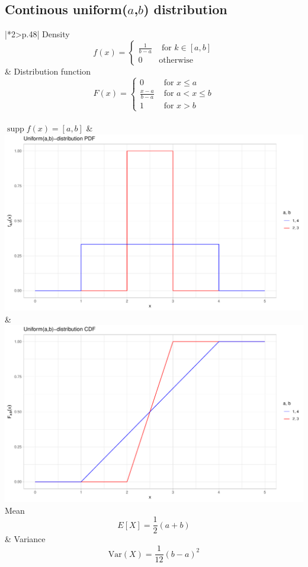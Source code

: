 \documentclass{article}
\DeclareMathOperator\supp{supp}
\begin{document}
	\subsection{Continous uniform($a$,$b$) distribution}
	\begin{tabular}{|*2{>{\centering\arraybackslash}p{}|}}
		\hline
		Density
		\[ f \left ( x \right ) = \left \{\begin{matrix}
			\frac{1}{b-a} & \text{ for } k \in \left[ a,b\right] \\ 
			0 & \text{otherwise}
		\end{matrix}\right. \] 
		& Distribution function
		\[ F\left ( x \right ) = \left\{\begin{matrix}
			0 & \text{ for } x\leq a\\ 
			\frac{x-a}{b-a} & \text{ for } a< x\leq b\\ 
			1 & \text{ for } x> b
		\end{matrix}\right. \]
		\\
		$\supp f\left( x\right) = \left[ a,b\right] $ &
		\\
		\includegraphics[width=1.0\linewidth]{material/uniform_PDF}
		\label{fig:uniform_PDF}
		&
		\includegraphics[width=1.0\linewidth]{material/uniform_CDF}
		\label{fig:uniform_CDF}
		\\
		\hline
		Mean
		\[ E\left [ X \right ] = \frac{1}{2} \left( a+b\right) \]
		& Variance
		\[ \text{Var}\left( X\right) = \frac{1}{12} \left( b-a\right)^{2} \]
		\\
	\end{tabular} \\
	
\end{document}
